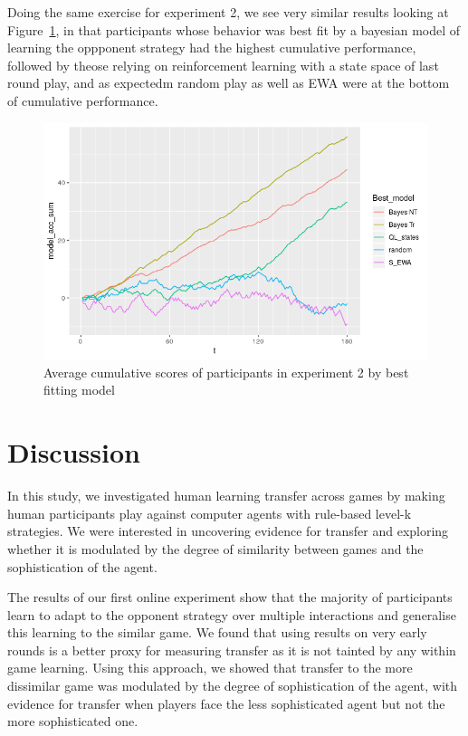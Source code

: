 \documentclass[man,floatsintext]{apa6}
\begin{document}
Doing the same exercise for experiment 2, we see very similar results looking at Figure~\ref{fig:exp2-cumScores}, in that participants whose behavior was best fit by a bayesian model of learning the oppponent strategy had the highest cumulative performance, followed by theose relying on reinforcement learning with a state space of last round play, and as expectedm random play as well as EWA were at the bottom of cumulative performance.

\begin{figure}

{\centering \includegraphics{../Report/images/exp2_cumScores} 

}

\caption{Average cumulative scores of participants in experiment 2 by best fitting model}\label{fig:exp2-cumScores}
\end{figure}

\hypertarget{discussion}{%
\section{Discussion}\label{discussion}}

In this study, we investigated human learning transfer across games by making human participants play against computer agents with rule-based level-k strategies. We were interested in uncovering evidence for transfer and exploring whether it is modulated by the degree of similarity between games and the sophistication of the agent.

The results of our first online experiment show that the majority of participants learn to adapt to the opponent strategy over multiple interactions and generalise this learning to the similar game. We found that using results on very early rounds is a better proxy for measuring transfer as it is not tainted by any within game learning. Using this approach, we showed that transfer to the more dissimilar game was modulated by the degree of sophistication of the agent, with evidence for transfer when players face the less sophisticated agent but not the more sophisticated one.
\end{document}
